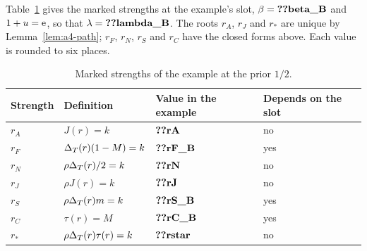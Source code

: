 Table~\ref{tab:a4-thresholds} gives the marked strengths at the example's slot, \(\beta=\reg{beta_B}\) and
\(1+u=\mathrm{e}\), so that \(\lambda=\reg{lambda_B}\). The roots \(r_A\), \(r_J\) and \(r_*\) are unique by
Lemma~\ref{lem:a4-path}; \(r_F\), \(r_N\), \(r_S\) and \(r_C\) have the closed forms above. Each value is rounded to six
places.

\begin{table}[ht]
\centering
\caption{Marked strengths of the example at the prior \(1/2\).}\label{tab:a4-thresholds}
\small
\begin{tabular}{@{}llll@{}}
\toprule
Strength & Definition & Value in the example & Depends on the slot\\
\midrule
\(r_A\) & \(J(r)=k\) & \(\reg{rA}\) & no\\
\(r_F\) & \(\Delta_T(r)(1-M)=k\) & \(\reg{rF_B}\) & yes\\
\(r_N\) & \(\rho\Delta_T(r)/2=k\) & \(\reg{rN}\) & no\\
\(r_J\) & \(\rho J(r)=k\) & \(\reg{rJ}\) & no\\
\(r_S\) & \(\rho\Delta_T(r)m=k\) & \(\reg{rS_B}\) & yes\\
\(r_C\) & \(\tau(r)=M\) & \(\reg{rC_B}\) & yes\\
\(r_*\) & \(\rho\Delta_T(r)\tau(r)=k\) & \(\reg{rstar}\) & no\\
\bottomrule
\end{tabular}
\end{table}

